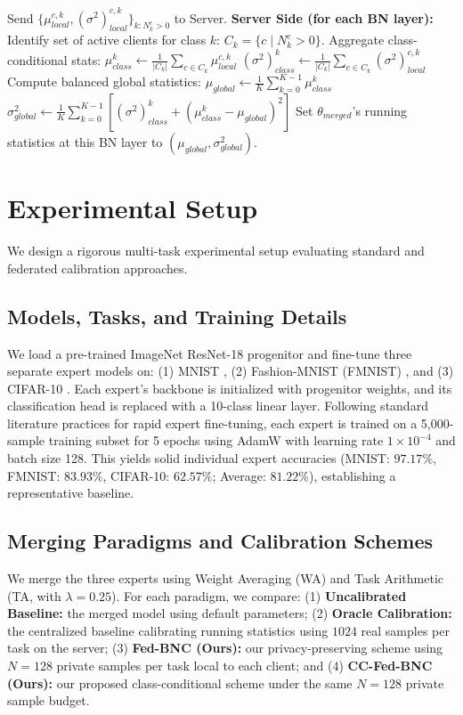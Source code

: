 \documentclass{article}
\theoremstyle{plain}
\theoremstyle{definition}
\theoremstyle{remark}
\begin{document}
\begin{algorithm}[t]
\begin{algorithmic}[1]
\STATE Send $\{\mu_{local}^{c,k}, (\sigma^2)_{local}^{c,k}\}_{k: N_k^c > 0}$ to Server.
\STATE \textbf{Server Side (for each BN layer):}
    \STATE Identify set of active clients for class $k$: $C_k = \{c \mid N_k^c > 0\}$.
    \STATE Aggregate class-conditional stats:
    \STATE $\mu_{class}^k \leftarrow \frac{1}{|C_k|} \sum_{c \in C_k} \mu_{local}^{c,k}$
    \STATE $(\sigma^2)_{class}^k \leftarrow \frac{1}{|C_k|} \sum_{c \in C_k} (\sigma^2)_{local}^{c,k}$
\ENDFOR
\STATE Compute balanced global statistics:
\STATE $\mu_{global} \leftarrow \frac{1}{K} \sum_{k=0}^{K-1} \mu_{class}^k$
\STATE $\sigma_{global}^2 \leftarrow \frac{1}{K} \sum_{k=0}^{K-1} \left[ (\sigma^2)_{class}^k + (\mu_{class}^k - \mu_{global})^2 \right]$
\STATE Set $\theta_{merged}$'s running statistics at this BN layer to $(\mu_{global}, \sigma_{global}^2)$.
\end{algorithmic}
\end{algorithm}

\section{Experimental Setup}
\label{sec:setup}

We design a rigorous multi-task experimental setup evaluating standard and federated calibration approaches.

\subsection{Models, Tasks, and Training Details}
We load a pre-trained ImageNet ResNet-18 progenitor \cite{he2016deep} and fine-tune three separate expert models on: (1) MNIST \cite{lecun1998gradient}, (2) Fashion-MNIST (FMNIST) \cite{xiao2017fashion}, and (3) CIFAR-10 \cite{krizhevsky2009learning}. Each expert's backbone is initialized with progenitor weights, and its classification head is replaced with a 10-class linear layer. Following standard literature practices for rapid expert fine-tuning, each expert is trained on a 5,000-sample training subset for 5 epochs using AdamW with learning rate $1\times 10^{-4}$ and batch size 128. This yields solid individual expert accuracies (MNIST: $97.17\%$, FMNIST: $83.93\%$, CIFAR-10: $62.57\%$; Average: $81.22\%$), establishing a representative baseline.

\subsection{Merging Paradigms and Calibration Schemes}
We merge the three experts using Weight Averaging (WA) and Task Arithmetic (TA, with $\lambda = 0.25$). For each paradigm, we compare: (1) \textbf{Uncalibrated Baseline:} the merged model using default parameters; (2) \textbf{Oracle Calibration:} the centralized baseline calibrating running statistics using $1024$ real samples per task on the server; (3) \textbf{Fed-BNC (Ours):} our privacy-preserving scheme using $N = 128$ private samples per task local to each client; and (4) \textbf{CC-Fed-BNC (Ours):} our proposed class-conditional scheme under the same $N = 128$ private sample budget.
\end{document}
